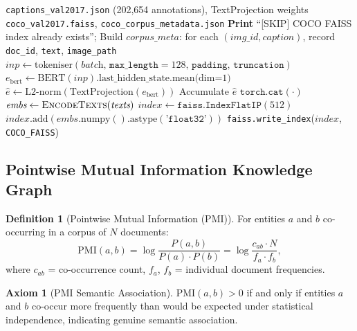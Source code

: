 \documentclass[12pt, a4paper]{article}
\theoremstyle{definition}
\newtheorem{definition}{Definition}[section]
\newtheorem{axiom}{Axiom}[section]
\theoremstyle{plain}
\theoremstyle{remark}
\begin{document}
\begin{algorithm}[H]
\caption{BUILD\_COCO\_FAISS\_INDEX}
\label{alg:coco_faiss}
\begin{algorithmic}[1]
\Require \texttt{captions\_val2017.json} (202,654 annotations), TextProjection weights
\Ensure \texttt{coco\_val2017.faiss}, \texttt{coco\_corpus\_metadata.json}
  \State \textbf{Print} ``[SKIP] COCO FAISS index already exists''; \Return
\EndIf
\State Build $\textit{corpus\_meta}$: for each $(img\_id, caption)$, record \texttt{doc\_id}, \texttt{text}, \texttt{image\_path}
    \State $\textit{inp} \gets \text{tokeniser}(\textit{batch},\, \texttt{max\_length}=128,\, \texttt{padding},\, \texttt{truncation})$
    \State $e_{\text{bert}} \gets \text{BERT}(\textit{inp}).\text{last\_hidden\_state.mean(dim=1)}$ \Comment{$[256, 768]$}
    \State $\hat{e} \gets \text{L2-norm}(\text{TextProjection}(e_{\text{bert}}))$ \Comment{$[256, 512]$}
    \State Accumulate $\hat{e}$
  \EndFor
  \State \Return $\texttt{torch.cat}(\cdot)$ \Comment{$[N, 512]$}
\EndProcedure
\State $\textit{embs} \gets \Call{EncodeTexts}{\textit{texts}}$
\State $\textit{index} \gets \texttt{faiss.IndexFlatIP}(512)$
\State $\textit{index}.\text{add}(\textit{embs}.\text{numpy}().\text{astype}(\texttt{'float32'}))$
\State \texttt{faiss.write\_index}($\textit{index}$, \texttt{COCO\_FAISS})
\end{algorithmic}
\end{algorithm}

\subsection{Pointwise Mutual Information Knowledge Graph}

\begin{definition}[Pointwise Mutual Information (PMI)]
For entities $a$ and $b$ co-occurring in a corpus of $N$ documents:
\[
\text{PMI}(a, b) = \log \frac{P(a,b)}{P(a) \cdot P(b)} = \log \frac{c_{ab} \cdot N}{f_a \cdot f_b},
\]
where $c_{ab}$ = co-occurrence count, $f_a$, $f_b$ = individual document frequencies.
\end{definition}

\begin{axiom}[PMI Semantic Association]
$\text{PMI}(a,b) > 0$ if and only if entities $a$ and $b$ co-occur more frequently than would be expected under statistical independence, indicating genuine semantic association.
\end{axiom}
\end{document}
